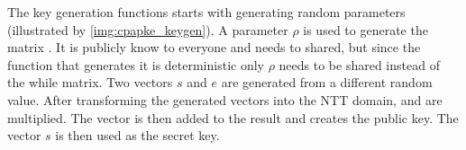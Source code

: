 
The key generation functions starts with generating random parameters (illustrated by \ref{img:cpapke_keygen}). A parameter $\rho$ is used to generate the matrix . It is publicly know to everyone and needs to shared, but since the function that generates it is deterministic only $\rho$ needs to be shared instead of the while matrix. Two vectors $s$ and $e$ are generated from a different random value. After transforming the generated vectors into the NTT domain,  and  are multiplied. The vector  is then added to the result and creates the public key. The vector $s$ is then used as the secret key.
